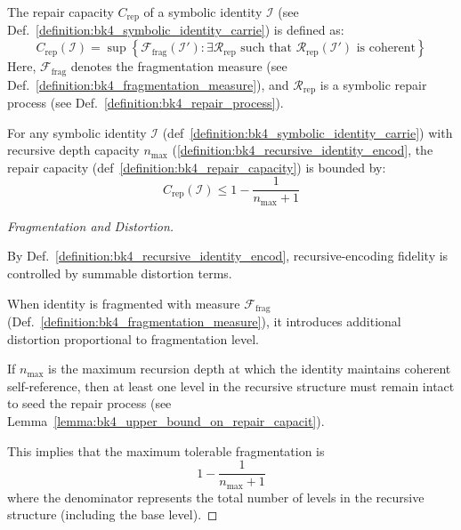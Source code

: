 \begin{definition}
\label{definition:bk4_repair_capacity}
The repair capacity $C_{\text{rep}}$ of a symbolic identity $\mathcal{I}$ (see Def.~\ref{definition:bk4_symbolic_identity_carrie}) is defined as:
\begin{equation}
    C_{\text{rep}}(\mathcal{I}) = \sup \left\{ \mathcal{F}_{\text{frag}}(\mathcal{I}') : \exists \mathcal{R}_{\text{rep}} \text{ such that } \mathcal{R}_{\text{rep}}(\mathcal{I}') \text{ is coherent} \right\}
\end{equation}
Here, $\mathcal{F}_{\text{frag}}$ denotes the fragmentation measure (see Def.~\ref{definition:bk4_fragmentation_measure}), and $\mathcal{R}_{\text{rep}}$ is a symbolic repair process (see Def.~\ref{definition:bk4_repair_process}).
\end{definition}

\begin{lemma} \label{lemma:bk4_upper_bound_on_repair_capacit}
For any symbolic identity $\mathcal{I}$ (def~\ref{definition:bk4_symbolic_identity_carrie}) with recursive depth capacity $n_{\text{max}}$ (\ref{definition:bk4_recursive_identity_encod}, the repair capacity (def~\ref{definition:bk4_repair_capacity}) is bounded by:
\begin{equation}
    C_{\text{rep}}(\mathcal{I}) \leq 1 - \frac{1}{n_{\text{max}} + 1}
\end{equation}
\end{lemma}
\begin{proof}[Fragmentation and Distortion]
\label{proof:bk4_fragmentation_distortion_encoding}
\leavevmode

By Def.~\ref{definition:bk4_recursive_identity_encod}, recursive-encoding
fidelity is controlled by summable distortion terms.

When identity is fragmented with measure
$\mathcal{F}_{\text{frag}}$ (Def.~\ref{definition:bk4_fragmentation_measure}),
it introduces additional distortion proportional to fragmentation level.

If $n_{\text{max}}$ is the maximum recursion depth at which the identity maintains coherent self-reference, then at least one level in the recursive structure must remain intact to seed the repair process (see Lemma~\ref{lemma:bk4_upper_bound_on_repair_capacit}). 

This implies that the maximum tolerable fragmentation is 
\[
1 - \frac{1}{n_{\text{max}} + 1}
\]
where the denominator represents the total number of levels in the recursive structure (including the base level).
\end{proof}
